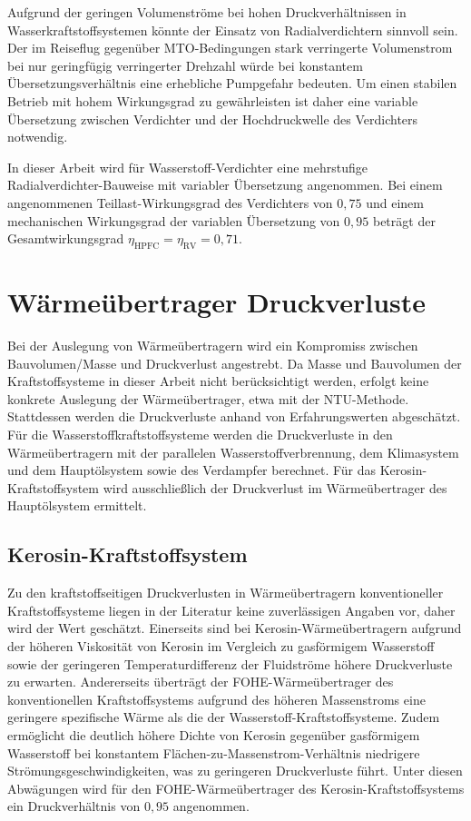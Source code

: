 Aufgrund der geringen Volumenströme bei hohen Druckverhältnissen in Wasserkraftstoffsystemen könnte der Einsatz von Radialverdichtern sinnvoll sein. Der im Reiseflug gegenüber MTO-Bedingungen stark verringerte Volumenstrom bei nur geringfügig verringerter Drehzahl würde bei konstantem Übersetzungsverhältnis eine erhebliche Pumpgefahr bedeuten. Um einen stabilen Betrieb mit hohem Wirkungsgrad zu gewährleisten ist daher eine variable Übersetzung zwischen Verdichter und der Hochdruckwelle des Verdichters notwendig. 

In dieser Arbeit wird für Wasserstoff-Verdichter eine mehrstufige Radialverdichter-Bauweise mit variabler Übersetzung angenommen. Bei einem angenommenen Teillast-Wirkungsgrad des Verdichters von $0,75$ und einem mechanischen Wirkungsgrad der variablen Übersetzung von $0,95$ beträgt der Gesamtwirkungsgrad $\eta_{\mathrm{HPFC}}=\eta_\mathrm{RV}=0,71$.

\section{Wärmeübertrager Druckverluste}

Bei der Auslegung von Wärmeübertragern wird ein Kompromiss zwischen Bauvolumen/Masse und Druckverlust angestrebt. Da Masse und Bauvolumen der Kraftstoffsysteme in dieser Arbeit nicht berücksichtigt werden, erfolgt keine konkrete Auslegung der Wärmeübertrager, etwa mit der NTU-Methode. Stattdessen werden die Druckverluste anhand von Erfahrungswerten abgeschätzt. Für die Wasserstoffkraftstoffsysteme werden die Druckverluste in den Wärmeübertragern mit der parallelen Wasserstoffverbrennung, dem Klimasystem und dem Hauptölsystem sowie des Verdampfer berechnet. Für das Kerosin-Kraftstoffsystem wird ausschließlich der Druckverlust im Wärmeübertrager des Hauptölsystem ermittelt.

\subsection{Kerosin-Kraftstoffsystem}

Zu den kraftstoffseitigen Druckverlusten in Wärmeübertragern konventioneller Kraftstoffsysteme liegen in der Literatur keine zuverlässigen Angaben vor, daher wird der Wert geschätzt. Einerseits sind bei Kerosin-Wärmeübertragern aufgrund der höheren Viskosität von Kerosin im Vergleich zu gasförmigem Wasserstoff sowie der geringeren Temperaturdifferenz der Fluidströme höhere Druckverluste zu erwarten. Andererseits überträgt der FOHE-Wärmeübertrager des konventionellen Kraftstoffsystems aufgrund des höheren Massenstroms eine geringere spezifische Wärme als die der Wasserstoff-Kraftstoffsysteme. Zudem ermöglicht die deutlich höhere Dichte von Kerosin gegenüber gasförmigem Wasserstoff bei konstantem Flächen-zu-Massenstrom-Verhältnis niedrigere Strömungsgeschwindigkeiten, was zu geringeren Druckverluste führt. Unter diesen Abwägungen wird für den FOHE-Wärmeübertrager des Kerosin-Kraftstoffsystems ein Druckverhältnis von $0,95$ angenommen.

